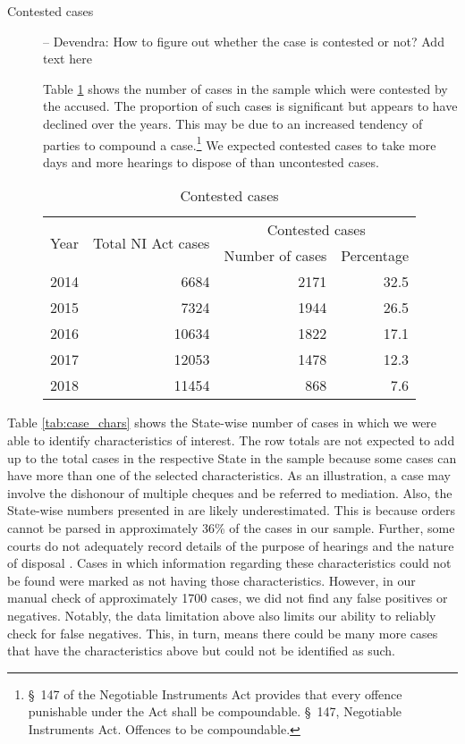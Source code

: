 \documentclass[12pt,a4paper]{article}
\begin{document}
\begin{description}
\item[]

\item [Contested cases] -- {\color{red} Devendra: How to figure out whether the case is contested or not? Add text here}

Table \ref{tab:cont_yearWise} shows the number of cases in the sample which were contested by the accused. The proportion of such cases is significant but appears to have declined over the years. This may be due to an increased tendency of parties to compound a case.\footnote{\S~147 of the Negotiable Instruments Act provides that every offence punishable under the Act shall be compoundable. \S~147, Negotiable Instruments Act. Offences to be compoundable.} We expected contested cases to take more days and more hearings to dispose of than uncontested cases.

\begin{table}[!ht]
\caption{Contested cases}\label{tab:cont_yearWise}
\centering
\footnotesize
\begin{tabular}{@{}lrrr@{}}
\toprule
\multirow{2}{*}{Year} & \multirow{2}{*}{Total NI Act cases} & \multicolumn{2}{c}{Contested cases}\\
\cmidrule{3-4}
&& Number of cases & Percentage \\
\midrule%
2014 & 6684 & 2171 & 32.5 \\
2015 & 7324 & 1944 & 26.5 \\
2016 & 10634 & 1822 & 17.1 \\
2017 & 12053 & 1478 & 12.3 \\
2018 & 11454 & 868 & 7.6 \\
\bottomrule
\end{tabular}
\end{table}

\item[]

\end{description}

Table \ref{tab:case_chars} shows the State-wise number of cases in which we were able to identify characteristics of interest. The row totals are not expected to add up to the total cases in the respective State in the sample because some cases can have more than one of the selected characteristics. As an illustration, a case may involve the dishonour of multiple cheques and be referred to mediation. Also, the State-wise numbers presented in  are likely underestimated. This is because orders cannot be parsed in approximately 36\% of the cases in our sample. Further, some courts do not adequately record details of the purpose of hearings and the nature of disposal \autocite{damle2020_ecourtsData}. Cases in which information regarding these characteristics could not be found were marked as not having those characteristics. However, in our manual check of approximately 1700 cases, we did not find any false positives or negatives. Notably, the data limitation above also limits our ability to reliably check for false negatives. This, in turn, means there could be many more cases that have the characteristics above but could not be identified as such.
\end{document}
